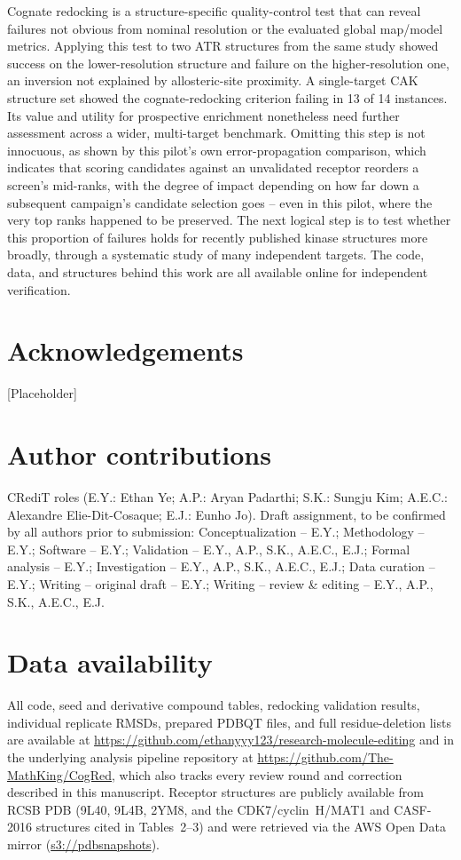 \documentclass[global,twocolumn]{svjour}
\begin{document}
Cognate redocking is a structure-specific quality-control test that can
reveal failures not obvious from nominal resolution or the evaluated
global map/model metrics. Applying this test to two ATR structures from
the same study showed success on the lower-resolution structure and
failure on the higher-resolution one, an inversion not explained by
allosteric-site proximity. A single-target CAK structure set showed the
cognate-redocking criterion failing in 13 of 14 instances. Its value and
utility for prospective enrichment nonetheless need further assessment
across a wider, multi-target benchmark. Omitting this step is not
innocuous, as shown by this pilot's own error-propagation comparison,
which indicates that scoring candidates against an unvalidated receptor
reorders a screen's mid-ranks, with the degree of impact depending on how
far down a subsequent campaign's candidate selection goes -- even in this
pilot, where the very top ranks happened to be preserved. The next
logical step is to test whether this proportion of failures holds for
recently published kinase structures more broadly, through a systematic
study of many independent targets. The code, data, and structures behind
this work are all available online for independent verification.

\section*{Acknowledgements}
[Placeholder]

\section*{Author contributions}
CRediT roles (E.Y.: Ethan Ye; A.P.: Aryan Padarthi; S.K.: Sungju Kim;
A.E.C.: Alexandre Elie-Dit-Cosaque; E.J.: Eunho Jo). Draft assignment,
to be confirmed by all authors prior to submission: Conceptualization --
E.Y.; Methodology -- E.Y.; Software -- E.Y.; Validation -- E.Y., A.P.,
S.K., A.E.C., E.J.; Formal analysis -- E.Y.; Investigation -- E.Y.,
A.P., S.K., A.E.C., E.J.; Data curation -- E.Y.; Writing -- original
draft -- E.Y.; Writing -- review \& editing -- E.Y., A.P., S.K.,
A.E.C., E.J.

\section*{Data availability}
All code, seed and derivative compound tables, redocking validation results,
individual replicate RMSDs, prepared PDBQT files, and full residue-deletion
lists are available at \url{https://github.com/ethanyyy123/research-molecule-editing}
and in the underlying analysis pipeline repository at
\url{https://github.com/The-MathKing/CogRed}, which also tracks every
review round and correction described in this manuscript. Receptor
structures are publicly available from RCSB PDB (9L40, 9L4B, 2YM8, and the
CDK7/cyclin~H/MAT1 and CASF-2016 structures cited in Tables~2--3) and were
retrieved via the AWS Open Data mirror (\url{s3://pdbsnapshots}).
\end{document}
